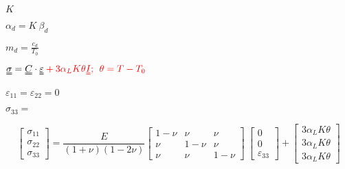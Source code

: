 \documentclass[onecolumn,11pt]{report}
\def\lthtmlcheckvsize{\ifdim\ht\sizebox<\vsize 
  \ifdim\wd\sizebox<\hsize\expandafter\hfill\fi \expandafter\vfill
  \else\expandafter\vss\fi}%
\begin{document}
{\newpage\clearpage
{}%
$ K$%
\lthtmlindisplaymathZ
\lthtmlcheckvsize\clearpage}

{\newpage\clearpage
{}%
$\displaystyle \alpha_d = K \: \beta_d$%
\lthtmlindisplaymathZ
\lthtmlcheckvsize\clearpage}

{\newpage\clearpage
{}%
$\displaystyle m_d = \frac{c_d}{T_0}$%
\lthtmlindisplaymathZ
\lthtmlcheckvsize\clearpage}

{\newpage\clearpage
{}%
$\displaystyle \uuline{\sigma} = \uuline{C} \cdot \uuline{\varepsilon} \color{red} + 3 \alpha_L K \theta \uuline{I}; \:\: \theta = T - T_0$%
\lthtmlindisplaymathZ
\lthtmlcheckvsize\clearpage}

{\newpage\clearpage
{}%
$ \varepsilon_{11} = \varepsilon_{22} = 0$%
\lthtmlindisplaymathZ
\lthtmlcheckvsize\clearpage}

{\newpage\clearpage
{}%
$ \sigma_{33} = $%
\lthtmlindisplaymathZ
\lthtmlcheckvsize\clearpage}

{\newpage\clearpage
{}%
\begin{displaymath}%
	\left[
\begin{array} {c}
\sigma_{11} \\
\sigma_{22} \\
\sigma_{33}
\end{array}
\right]
=
\frac{E}{(1+\nu)(1-2\nu)}
\left[
\begin{array}{ccc}
1-\nu & \nu & \nu \\
\nu & 1-\nu & \nu \\
\nu & \nu & 1-\nu
\end{array}
\right]
\:
\left[
\begin{array} {c}
0 \\
0 \\
\varepsilon_{33}
\end{array}
\right]
+
\left[
\begin{array} {c}
3 \alpha_L K \theta \\
3 \alpha_L K \theta \\
3 \alpha_L K \theta
\end{array}
\right]\end{displaymath}%
\lthtmldisplayZ
\lthtmlcheckvsize\clearpage}
\end{document}
